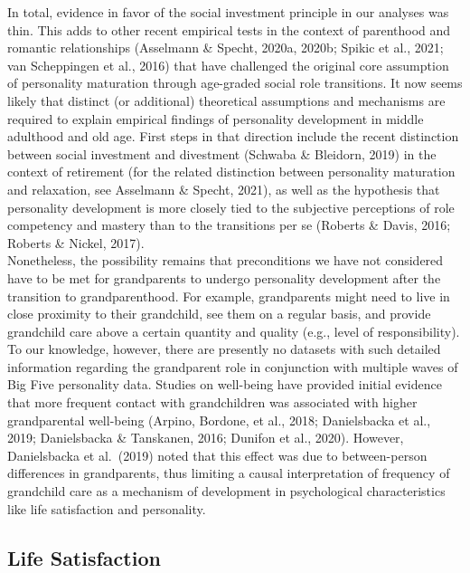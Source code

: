 \documentclass[
  english,
  man,floatsintext]{apa7}
\begin{document}
In total, evidence in favor of the social investment principle in our analyses was thin. This adds to other recent empirical tests in the context of parenthood and romantic relationships (Asselmann \& Specht, 2020a, 2020b; Spikic et al., 2021; van Scheppingen et al., 2016) that have challenged the original core assumption of personality maturation through age-graded social role transitions. It now seems likely that distinct (or additional) theoretical assumptions and mechanisms are required to explain empirical findings of personality development in middle adulthood and old age. First steps in that direction include the recent distinction between social investment and divestment (Schwaba \& Bleidorn, 2019) in the context of retirement (for the related distinction between personality maturation and relaxation, see Asselmann \& Specht, 2021), as well as the hypothesis that personality development is more closely tied to the subjective perceptions of role competency and mastery than to the transitions per se (Roberts \& Davis, 2016; Roberts \& Nickel, 2017).\\
Nonetheless, the possibility remains that preconditions we have not considered have to be met for grandparents to undergo personality development after the transition to grandparenthood. For example, grandparents might need to live in close proximity to their grandchild, see them on a regular basis, and provide grandchild care above a certain quantity and quality (e.g., level of responsibility). To our knowledge, however, there are presently no datasets with such detailed information regarding the grandparent role in conjunction with multiple waves of Big Five personality data. Studies on well-being have provided initial evidence that more frequent contact with grandchildren was associated with higher grandparental well-being (Arpino, Bordone, et al., 2018; Danielsbacka et al., 2019; Danielsbacka \& Tanskanen, 2016; Dunifon et al., 2020). However, Danielsbacka et al.~(2019) noted that this effect was due to between-person differences in grandparents, thus limiting a causal interpretation of frequency of grandchild care as a mechanism of development in psychological characteristics like life satisfaction and personality.

\hypertarget{life-satisfaction-2}{%
\subsection{Life Satisfaction}\label{life-satisfaction-2}}
\end{document}
